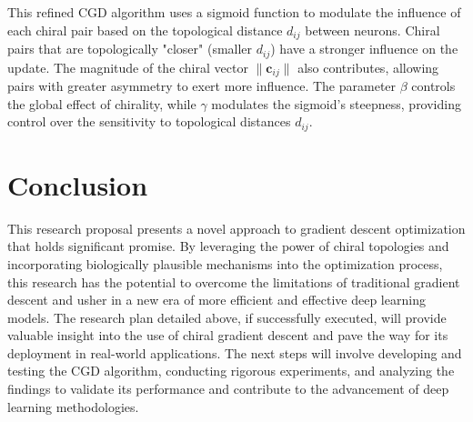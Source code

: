 \documentclass[12pt, a4paper]{article}
\begin{document}
This refined CGD algorithm uses a sigmoid function to modulate the influence of each chiral pair based on the topological distance \(d_{ij}\) between neurons. Chiral pairs that are topologically "closer" (smaller \(d_{ij}\)) have a stronger influence on the update. The magnitude of the chiral vector \(\| \mathbf{c}_{ij} \|\) also contributes, allowing pairs with greater asymmetry to exert more influence. The parameter \(\beta\) controls the global effect of chirality, while \(\gamma\) modulates the sigmoid's steepness, providing control over the sensitivity to topological distances \(d_{ij}\).



\section{Conclusion}
This research proposal presents a novel approach to gradient descent optimization that holds significant promise. By leveraging the power of chiral topologies and incorporating biologically plausible mechanisms into the optimization process, this research has the potential to overcome the limitations of traditional gradient descent and usher in a new era of more efficient and effective deep learning models. The research plan detailed above, if successfully executed, will provide valuable insight into the use of chiral gradient descent and pave the way for its deployment in real-world applications. The next steps will involve developing and testing the CGD algorithm, conducting rigorous experiments, and analyzing the findings to validate its performance and contribute to the advancement of deep learning methodologies.


\end{document}
